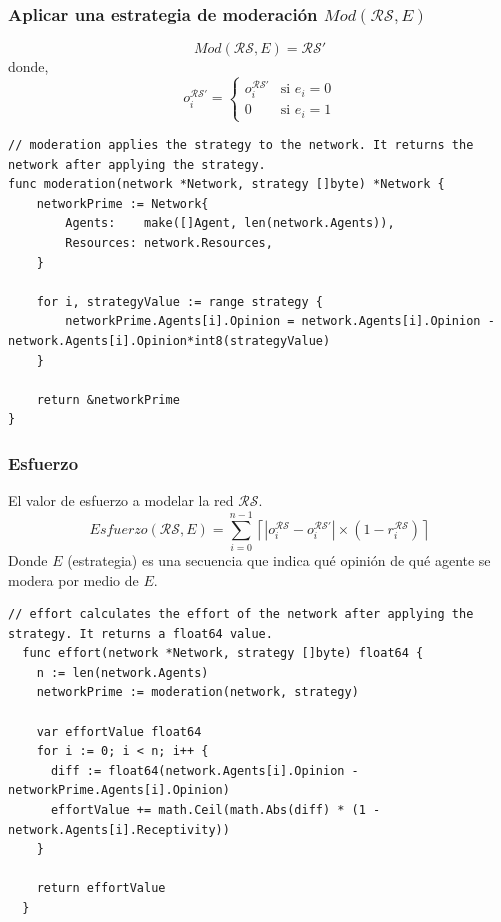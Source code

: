 \documentclass[letterpaper,10pt]{article}
\begin{document}
\subsubsection*{Aplicar una estrategia de moderación $Mod(\mathcal{R}\mathcal{S},E)$}
\[
  Mod(\mathcal{R}\mathcal{S}, E) = \mathcal{R}\mathcal{S}'
\]
donde,
\[
  o_i^{\mathcal{R}\mathcal{S}'} = 
  \begin{cases} 
        o_i^{\mathcal{R}\mathcal{S}'} & \text{si } e_i = 0 \\
        0        & \text{si } e_i = 1 
  \end{cases}
\]
\begin{lstlisting}[caption={Implementación del Mod}, label={lst:mod}]
// moderation applies the strategy to the network. It returns the network after applying the strategy.
func moderation(network *Network, strategy []byte) *Network {
	networkPrime := Network{
		Agents:    make([]Agent, len(network.Agents)),
		Resources: network.Resources,
	}

	for i, strategyValue := range strategy {
		networkPrime.Agents[i].Opinion = network.Agents[i].Opinion - network.Agents[i].Opinion*int8(strategyValue)
	}

	return &networkPrime
}
\end{lstlisting}
\newpage
\subsubsection*{Esfuerzo}
El valor de esfuerzo a modelar la red $\mathcal{R}\mathcal{S}$.
\[
  Esfuerzo(\mathcal{R}\mathcal{S}, E) = \sum_{i=0}^{n-1} \left\lceil  |o_i^{\mathcal{R}\mathcal{S}} - o_i^{\mathcal{R}\mathcal{S}'}| \times (1 - r_i^{\mathcal{R}\mathcal{S}}) \right\rceil 
\]
Donde $E$ (estrategia) es una secuencia que indica qué opinión de qué agente se modera por medio de $E$.
\begin{lstlisting}[caption={Implementación del esfuerzo}, label={lst:esfuerzo}]
  // effort calculates the effort of the network after applying the strategy. It returns a float64 value.
  func effort(network *Network, strategy []byte) float64 {
    n := len(network.Agents)
    networkPrime := moderation(network, strategy)
  
    var effortValue float64
    for i := 0; i < n; i++ {
      diff := float64(network.Agents[i].Opinion - networkPrime.Agents[i].Opinion)
      effortValue += math.Ceil(math.Abs(diff) * (1 - network.Agents[i].Receptivity))
    }
  
    return effortValue
  }
\end{lstlisting}
\end{document}

